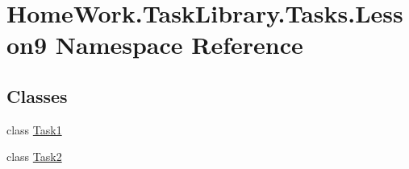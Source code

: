 \hypertarget{namespace_home_work_1_1_task_library_1_1_tasks_1_1_lesson9}{}\section{Home\+Work.\+Task\+Library.\+Tasks.\+Lesson9 Namespace Reference}
\label{namespace_home_work_1_1_task_library_1_1_tasks_1_1_lesson9}
\subsection*{Classes}
\begin{DoxyCompactItemize}
\item 
class \mbox{\hyperlink{class_home_work_1_1_task_library_1_1_tasks_1_1_lesson9_1_1_task1}{Task1}}
\item 
class \mbox{\hyperlink{class_home_work_1_1_task_library_1_1_tasks_1_1_lesson9_1_1_task2}{Task2}}
\end{DoxyCompactItemize}
